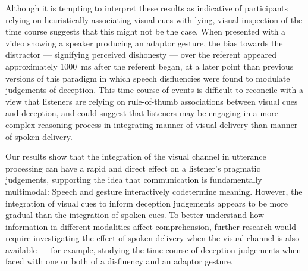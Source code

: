 \documentclass[a4paper,man,natbib]{apa6}
\begin{document}
Although it is tempting to interpret these results as indicative of participants relying on heuristically associating visual cues with lying, visual inspection of the time course suggests that this might not be the case.
When presented with a video showing a speaker producing an adaptor gesture, the bias towards the distractor --- signifying perceived dishonesty --- over the referent appeared approximately 1000~ms after the referent began, at a later point than previous versions of this paradigm in which speech disfluencies were found to modulate judgements of deception. 
This time course of events is difficult to reconcile with a view that listeners are relying on rule-of-thumb associations between visual cues and deception, and could suggest that listeners may be engaging in a more complex reasoning process in integrating manner of visual delivery than manner of spoken delivery. 

Our results show that the integration of the visual channel in utterance processing can have a rapid and direct effect on a listener's pragmatic judgements, supporting the idea that communication is fundamentally multimodal: 
Speech and gesture interactively codetermine meaning.
However, the integration of visual cues to inform deception judgements appears to be more gradual than the integration of spoken cues.
To better understand how information in different modalities affect comprehension, further research would require investigating the effect of spoken delivery when the visual channel is also available --- for example, studying the time course of deception judgements when faced with one or both of a disfluency and an adaptor gesture.



\end{document}
